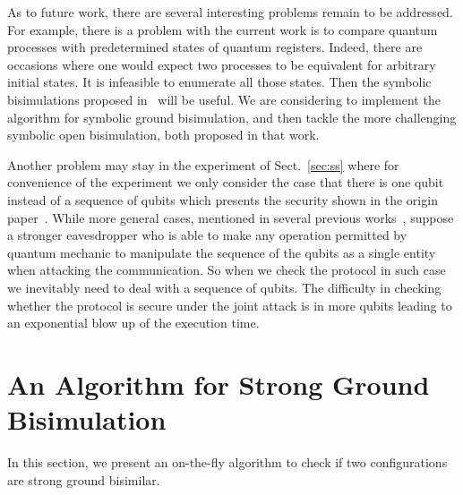 \documentclass[a4paper,runningheads]{llncs}
\begin{document}
As to future work, there are several interesting problems remain to be addressed.
For example, there is a problem with the current work is to compare quantum processes with predetermined states of quantum registers. Indeed, there are occasions where one would expect two processes to be equivalent for arbitrary initial states. It is infeasible to enumerate all those states. Then the symbolic bisimulations proposed in~\cite{FDY14} will be useful. We are considering to implement the algorithm for symbolic ground bisimulation, and then tackle the more challenging symbolic open bisimulation, both proposed in that work. 

Another problem may stay in the experiment of Sect.~\ref{sec:ss} where for convenience of the experiment we only consider the case that there is one qubit instead of a sequence of qubits which presents the security shown in the origin paper~\cite{BB84}. While more general cases, mentioned in several previous works~\cite{Mayers98,LC99,SP00}, suppose a stronger eavesdropper who is able to make any operation permitted by quantum mechanic to manipulate the sequence of the qubits as a single entity when attacking the communication. So when we check the protocol in such case we inevitably need to deal with a sequence of qubits. The difficulty in checking whether the protocol is secure under the joint attack is in more qubits leading to an exponential blow up of the execution time.
%
%
%
% 
% 
%



\appendix
\section{An Algorithm for Strong Ground Bisimulation}
\label{sec:strong_bisim}
In this section, we present an on-the-fly algorithm to check if two configurations are strong ground bisimilar.
\end{document}
